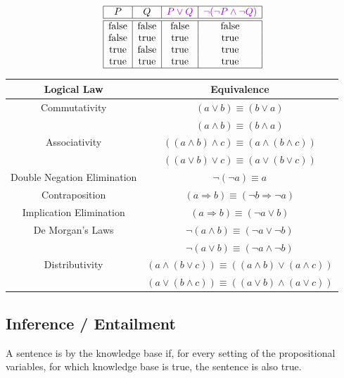 \documentclass[
../EiKI_Summary.tex,
]
{subfiles}
\begin{document}
\[
\begin{array}{|c|c|c|c|}
\hline
P & Q & \text{\defc{$P\lor Q$}} & \text{\defc{$\neg (\neg P\land \neg Q)$}} \\
\hline\hline
\text{false} & \text{false} & \text{false} & \text{false} \\
\text{false} & \text{true} & \text{true} & \text{true} \\
\text{true} & \text{false} & \text{true} & \text{true} \\
\text{true} & \text{true} & \text{true} & \text{true} \\
\hline
\end{array}
\]

\begin{center}	
    \begin{tabular}{|c|c|}
        \hline
        \textbf{Logical Law} & \textbf{Equivalence} \\
        \hline\hline
        Commutativity & $(a \lor b) \equiv (b \lor a)$ \\
        & $(a \land b) \equiv (b \land a)$ \\
        \hline
        Associativity & $((a \land b) \land c) \equiv (a \land (b \land c))$ \\
        & $((a \lor b) \lor c) \equiv (a \lor (b \lor c))$ \\
        \hline
        Double Negation Elimination & $\lnot(\lnot a) \equiv a$ \\
        \hline
        Contraposition & $(a \Rightarrow b) \equiv (\lnot b \Rightarrow \lnot a)$ \\
        \hline
        Implication Elimination & $(a \Rightarrow b) \equiv (\lnot a \lor b)$ \\
        \hline
        De Morgan's Laws & $\lnot(a \land b) \equiv (\lnot a \lor \lnot b)$ \\
        & $\lnot(a \lor b) \equiv (\lnot a \land \lnot b)$ \\
        \hline
        Distributivity & $(a \land (b \lor c)) \equiv ((a \land b) \lor (a \land c))$ \\
        & $(a \lor (b \land c)) \equiv ((a \lor b) \land (a \lor c))$ \\
        \hline
    \end{tabular}
\end{center}

\subsection{Inference / Entailment}
A sentence is  by the knowledge base if, for every setting of the propositional variables, for which knowledge base is true, the sentence is also true.
\end{document}
